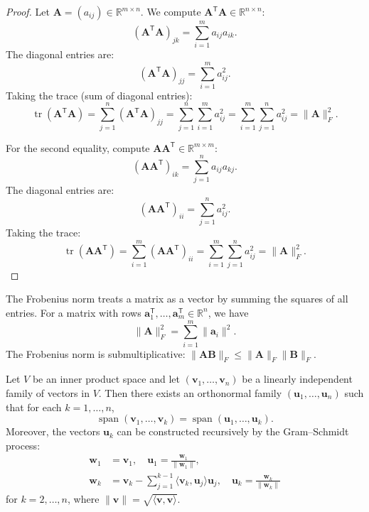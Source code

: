 \begin{proof}
  Let $\mathbf{A} = (a_{ij}) \in \mathbb{R}^{m \times n}$. We compute $\mathbf{A}^{\mathsf{T}}\mathbf{A} \in \mathbb{R}^{n \times n}$:
  \[
    (\mathbf{A}^{\mathsf{T}}\mathbf{A})_{jk} = \sum_{i=1}^{m} a_{ij} a_{ik}.
  \]
  The diagonal entries are:
  \[
    (\mathbf{A}^{\mathsf{T}}\mathbf{A})_{jj} = \sum_{i=1}^{m} a_{ij}^2.
  \]
  Taking the trace (sum of diagonal entries):
  \[
    \operatorname{tr}(\mathbf{A}^{\mathsf{T}}\mathbf{A}) = \sum_{j=1}^{n} (\mathbf{A}^{\mathsf{T}}\mathbf{A})_{jj} = \sum_{j=1}^{n} \sum_{i=1}^{m} a_{ij}^2 = \sum_{i=1}^{m}\sum_{j=1}^{n} a_{ij}^2 = \|\mathbf{A}\|_F^2.
  \]

  For the second equality, compute $\mathbf{A}\mathbf{A}^{\mathsf{T}} \in \mathbb{R}^{m \times m}$:
  \[
    (\mathbf{A}\mathbf{A}^{\mathsf{T}})_{ik} = \sum_{j=1}^{n} a_{ij} a_{kj}.
  \]
  The diagonal entries are:
  \[
    (\mathbf{A}\mathbf{A}^{\mathsf{T}})_{ii} = \sum_{j=1}^{n} a_{ij}^2.
  \]
  Taking the trace:
  \[
    \operatorname{tr}(\mathbf{A}\mathbf{A}^{\mathsf{T}}) = \sum_{i=1}^{m} (\mathbf{A}\mathbf{A}^{\mathsf{T}})_{ii} = \sum_{i=1}^{m} \sum_{j=1}^{n} a_{ij}^2 = \|\mathbf{A}\|_F^2.
  \]
\end{proof}

\begin{remark}
  The Frobenius norm treats a matrix as a vector by summing the squares of all entries.
  For a matrix with rows $\mathbf{a}_1^{\mathsf{T}},\dots,\mathbf{a}_m^{\mathsf{T}} \in \mathbb{R}^n$, we have
  \[
    \|\mathbf{A}\|_F^2 = \sum_{i=1}^{m} \|\mathbf{a}_i\|^2.
  \]
  The Frobenius norm is submultiplicative: $\|\mathbf{A}\mathbf{B}\|_F \leq \|\mathbf{A}\|_F \|\mathbf{B}\|_F$.
\end{remark}

\begin{theorem}
  Let $V$ be an inner product space and let $(\mathbf{v}_1,\dots,\mathbf{v}_n)$ be a linearly independent family of vectors in $V$.
  Then there exists an orthonormal family $(\mathbf{u}_1,\dots,\mathbf{u}_n)$ such that for each $k = 1,\dots,n$,
  \[
    \operatorname{span}(\mathbf{v}_1,\dots,\mathbf{v}_k) = \operatorname{span}(\mathbf{u}_1,\dots,\mathbf{u}_k).
  \]
  Moreover, the vectors $\mathbf{u}_k$ can be constructed recursively by the Gram--Schmidt process:
  \begin{align}
    \mathbf{w}_1 & = \mathbf{v}_1, \quad \mathbf{u}_1 = \frac{\mathbf{w}_1}{\|\mathbf{w}_1\|}, \label{eq:gs-base}                                                                           \\
    \mathbf{w}_k & = \mathbf{v}_k - \sum_{j=1}^{k-1} \langle \mathbf{v}_k, \mathbf{u}_j \rangle \mathbf{u}_j, \quad \mathbf{u}_k = \frac{\mathbf{w}_k}{\|\mathbf{w}_k\|} \label{eq:gs-step}
  \end{align}
  for $k = 2,\dots,n$, where $\|\mathbf{v}\| = \sqrt{\langle \mathbf{v}, \mathbf{v} \rangle}$.
\end{theorem}

